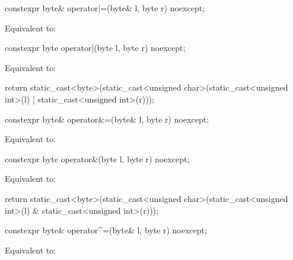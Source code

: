 %
\begin{itemdecl}
constexpr byte& operator|=(byte& l, byte r) noexcept;
\end{itemdecl}

\begin{itemdescr}
\pnum \effects Equivalent to: 
\end{itemdescr}

%
\begin{itemdecl}
constexpr byte operator|(byte l, byte r) noexcept;
\end{itemdecl}

\begin{itemdescr}
\pnum \effects Equivalent to:
\begin{codeblock}
return static_cast<byte>(static_cast<unsigned char>(static_cast<unsigned int>(l) |
                                                    static_cast<unsigned int>(r)));
\end{codeblock}
\end{itemdescr}

%
\begin{itemdecl}
constexpr byte& operator&=(byte& l, byte r) noexcept;
\end{itemdecl}

\begin{itemdescr}
\pnum \effects Equivalent to: 
\end{itemdescr}

%
\begin{itemdecl}
constexpr byte operator&(byte l, byte r) noexcept;
\end{itemdecl}

\begin{itemdescr}
\pnum \effects Equivalent to:
\begin{codeblock}
return static_cast<byte>(static_cast<unsigned char>(static_cast<unsigned int>(l) &
                                                    static_cast<unsigned int>(r)));
\end{codeblock}
\end{itemdescr}

%
\begin{itemdecl}
constexpr byte& operator^=(byte& l, byte r) noexcept;
\end{itemdecl}

\begin{itemdescr}
\pnum \effects Equivalent to: 
\end{itemdescr}

